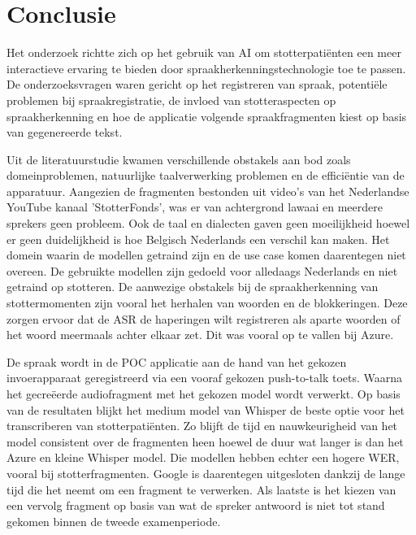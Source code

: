 
\chapter{Conclusie}%
\label{ch:conclusie}


Het onderzoek richtte zich op het gebruik van AI om stotterpatiënten een meer interactieve ervaring te bieden door spraakherkenningstechnologie toe te passen. De onderzoeksvragen waren gericht op het registreren van spraak, potentiële problemen bij spraakregistratie, de invloed van stotteraspecten op spraakherkenning en hoe de applicatie volgende spraakfragmenten kiest op basis van gegenereerde tekst.

Uit de literatuurstudie kwamen verschillende obstakels aan bod zoals domeinproblemen, natuurlijke taalverwerking problemen en de efficiëntie van de apparatuur. Aangezien de fragmenten bestonden uit video's van het Nederlandse YouTube kanaal 'StotterFonds', was er van achtergrond lawaai en meerdere sprekers geen probleem. Ook de taal en dialecten gaven geen moeilijkheid hoewel er geen duidelijkheid is hoe Belgisch Nederlands een verschil kan maken. Het domein waarin de modellen getraind zijn en de use case komen daarentegen niet overeen. De gebruikte modellen zijn gedoeld voor alledaags Nederlands en niet getraind op stotteren. De aanwezige obstakels bij de spraakherkenning van stottermomenten zijn vooral het herhalen van woorden en de blokkeringen. Deze zorgen ervoor dat de ASR de haperingen wilt registreren als aparte woorden of het woord meermaals achter elkaar zet. Dit was vooral op te vallen bij Azure.

De spraak wordt in de POC applicatie aan de hand van het gekozen invoerapparaat geregistreerd via een vooraf gekozen push-to-talk toets. Waarna het gecreëerde audiofragment met het gekozen model wordt verwerkt. Op basis van de resultaten blijkt het medium model van Whisper de beste optie voor het transcriberen van stotterpatiënten. Zo blijft de tijd en nauwkeurigheid van het model consistent over de fragmenten heen hoewel de duur wat langer is dan het Azure en kleine Whisper model. Die modellen hebben echter een hogere WER, vooral bij stotterfragmenten. Google is daarentegen uitgesloten dankzij de lange tijd die het neemt om een fragment te verwerken. Als laatste is het kiezen van een vervolg fragment op basis van wat de spreker antwoord is niet tot stand gekomen binnen de tweede examenperiode.

